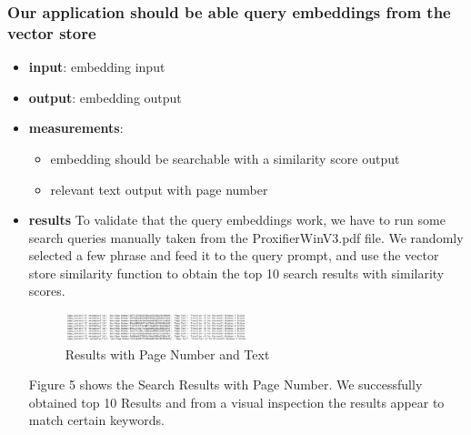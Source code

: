 \documentclass[conference]{IEEEtran}
\begin{document}
\subsubsection{Our application should be able query embeddings from the vector store}
\begin{itemize}
    \item \textbf{input}: embedding input
    \item \textbf{output}: embedding output
    \item \textbf{measurements}:
    \begin{itemize}
        \item embedding should be searchable with a similarity score output
        \item relevant text output with page number
    \end{itemize}
    \item \textbf{results}
    To validate that the query embeddings work, we have to run some search queries manually taken from the ProxifierWinV3.pdf file. We randomly selected a few phrase and feed it to the query prompt, and use the vector store similarity function to obtain the top 10 search results with similarity scores.
\begin{figure}[h!]
    \centering
    \includegraphics[width=0.5\textwidth]{pagenumber.png}
    \caption{Results with Page Number and Text}
    \label{fig:pagenumber-label}
\end{figure}
    
    Figure 5 shows the Search Results with Page Number. We successfully obtained top 10 Results and from a visual inspection the results appear to match certain keywords.
    

\end{itemize}
\end{document}

